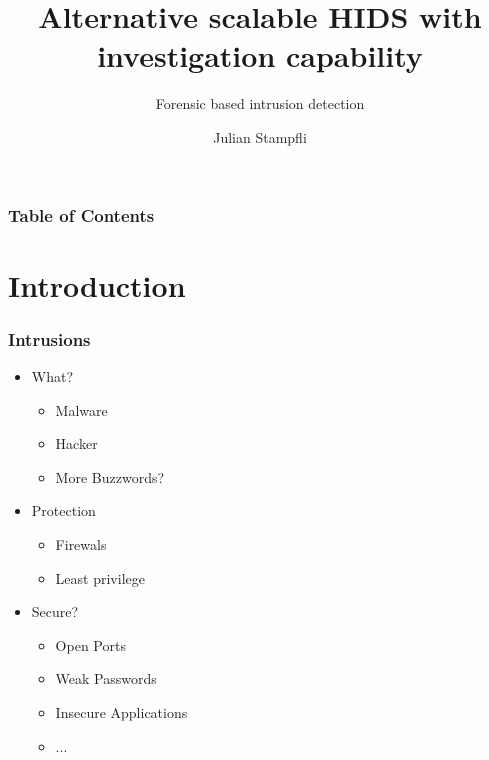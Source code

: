 \documentclass{beamer}
\begin{document}
\title{Alternative scalable HIDS with investigation capability}
\subtitle{Forensic based intrusion detection}
\author{Julian Stampfli}

\frame{\titlepage}


\begin{frame}
  \frametitle{Table of Contents}
  \tableofcontents
\end{frame}

\section{Introduction}

\begin{frame}[fragile]
  \frametitle{Intrusions}
  \begin{itemize}
    \item What?
    \begin{itemize}
      \item Malware
      \item Hacker
      \item More Buzzwords?
    \end{itemize}
    \pause
    \item Protection 
    \begin{itemize}
      \item Firewals
      \item Least privilege
    \end{itemize}

    \item Secure\pause ?
    \begin{itemize}
      \item Open Ports
      \item Weak Passwords
      \item Insecure Applications
      \item ...
    \end{itemize}
  \end{itemize}
\end{frame}
\end{document}
